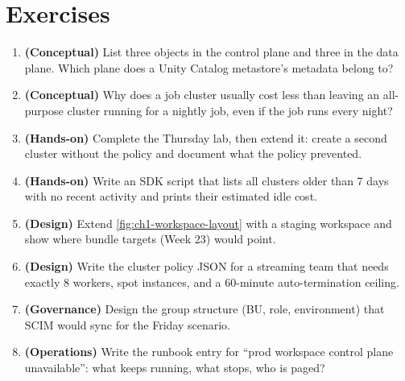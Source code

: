 \section{Exercises}
\begin{enumerate}
    \item \textbf{(Conceptual)} List three objects in the control plane and three in the data plane. Which plane does a Unity Catalog metastore's metadata belong to?
    \item \textbf{(Conceptual)} Why does a job cluster usually cost less than leaving an all-purpose cluster running for a nightly job, even if the job runs every night?
    \item \textbf{(Hands-on)} Complete the Thursday lab, then extend it: create a second cluster without the policy and document what the policy prevented.
    \item \textbf{(Hands-on)} Write an SDK script that lists all clusters older than 7 days with no recent activity and prints their estimated idle cost.
    \item \textbf{(Design)} Extend \cref{fig:ch1-workspace-layout} with a staging workspace and show where bundle targets (Week 23) would point.
    \item \textbf{(Design)} Write the cluster policy JSON for a streaming team that needs exactly 8 workers, spot instances, and a 60-minute auto-termination ceiling.
    \item \textbf{(Governance)} Design the group structure (BU, role, environment) that SCIM would sync for the Friday scenario.
    \item \textbf{(Operations)} Write the runbook entry for ``prod workspace control plane unavailable'': what keeps running, what stops, who is paged?
\end{enumerate}
